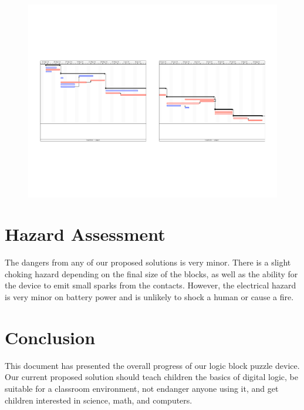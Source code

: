 \documentclass[12pt]{report}
\begin{document}
\begin{figure}[h!]
\begin{center}
	\includegraphics[width=.9\textheight, angle=90]{ganttChart}
\label{default}
\end{center}
\end{figure}


\section*{Hazard Assessment}

The dangers from any of our proposed solutions is very minor. There is a slight choking hazard depending on the final size of the blocks, as well as the ability for the device to emit small sparks from the contacts. However, the electrical hazard is very minor on battery power and is unlikely to shock a human or cause a fire.

\section*{Conclusion}

This document has presented the overall progress of our logic block puzzle device. Our current proposed solution should teach children the basics of digital logic, be suitable for a classroom environment, not endanger anyone using it, and get children interested in science, math, and computers.






\end{document}
